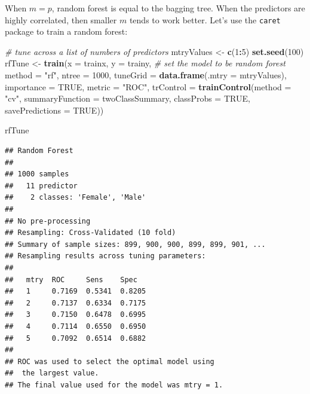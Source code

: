 \documentclass[12pt,]{krantz}
\makeatletter
\newenvironment{Shaded}{\begin{snugshade}}{\end{snugshade}}
\newcommand{\CommentTok}[1]{\textcolor[rgb]{0.37,0.37,0.37}{\textit{#1}}}
\newcommand{\DataTypeTok}[1]{\textcolor[rgb]{0.27,0.27,0.27}{#1}}
\newcommand{\DecValTok}[1]{\textcolor[rgb]{0.06,0.06,0.06}{#1}}
\newcommand{\KeywordTok}[1]{\textcolor[rgb]{0.27,0.27,0.27}{\textbf{#1}}}
\newcommand{\NormalTok}[1]{#1}
\newcommand{\OperatorTok}[1]{\textcolor[rgb]{0.43,0.43,0.43}{\textbf{#1}}}
\newcommand{\OtherTok}[1]{\textcolor[rgb]{0.37,0.37,0.37}{#1}}
\newcommand{\StringTok}[1]{\textcolor[rgb]{0.5,0.5,0.5}{#1}}
\newenvironment{kframe}{%
\medskip{}
\setlength{\fboxsep}{.8em}
 \def\at@end@of@kframe{}%
 \ifinner\ifhmode%
  \def\at@end@of@kframe{\end{minipage}}%
  \begin{minipage}{\columnwidth}%
 \fi\fi%
 \def\FrameCommand##1{\hskip\@totalleftmargin \hskip-\fboxsep
 \colorbox{shadecolor}{##1}\hskip-\fboxsep
     \hskip-\linewidth \hskip-\@totalleftmargin \hskip\columnwidth}%
 \MakeFramed {\advance\hsize-\width
   \@totalleftmargin\z@ \linewidth\hsize
   \@setminipage}}%
 {\par\unskip\endMakeFramed%
 \at@end@of@kframe}
\renewenvironment{Shaded}{\begin{kframe}}{\end{kframe}}
\makeatother
\begin{document}
When \(m=p\), random forest is equal to the bagging tree. When the predictors are highly correlated, then smaller \(m\) tends to work better. Let's use the \texttt{caret} package to train a random forest:

\begin{Shaded}
\begin{Highlighting}[]
\CommentTok{# tune across a list of numbers of predictors}
\NormalTok{mtryValues <-}\StringTok{ }\KeywordTok{c}\NormalTok{(}\DecValTok{1}\OperatorTok{:}\DecValTok{5}\NormalTok{)}
\KeywordTok{set.seed}\NormalTok{(}\DecValTok{100}\NormalTok{)}
\NormalTok{rfTune <-}\StringTok{ }\KeywordTok{train}\NormalTok{(}\DataTypeTok{x =}\NormalTok{ trainx, }
               \DataTypeTok{y =}\NormalTok{ trainy,}
               \CommentTok{# set the model to be random forest}
               \DataTypeTok{method =} \StringTok{"rf"}\NormalTok{,}
               \DataTypeTok{ntree =} \DecValTok{1000}\NormalTok{,}
               \DataTypeTok{tuneGrid =} \KeywordTok{data.frame}\NormalTok{(}\DataTypeTok{.mtry =}\NormalTok{ mtryValues),}
               \DataTypeTok{importance =} \OtherTok{TRUE}\NormalTok{,}
               \DataTypeTok{metric =} \StringTok{"ROC"}\NormalTok{,}
               \DataTypeTok{trControl =} \KeywordTok{trainControl}\NormalTok{(}\DataTypeTok{method =} \StringTok{"cv"}\NormalTok{,}
                           \DataTypeTok{summaryFunction =}\NormalTok{ twoClassSummary,}
                           \DataTypeTok{classProbs =} \OtherTok{TRUE}\NormalTok{,}
                           \DataTypeTok{savePredictions =} \OtherTok{TRUE}\NormalTok{))}
\end{Highlighting}
\end{Shaded}

\begin{Shaded}
\begin{Highlighting}[]
\NormalTok{rfTune}
\end{Highlighting}
\end{Shaded}

\begin{verbatim}
## Random Forest 
## 
## 1000 samples
##   11 predictor
##    2 classes: 'Female', 'Male' 
## 
## No pre-processing
## Resampling: Cross-Validated (10 fold) 
## Summary of sample sizes: 899, 900, 900, 899, 899, 901, ... 
## Resampling results across tuning parameters:
## 
##   mtry  ROC     Sens    Spec  
##   1     0.7169  0.5341  0.8205
##   2     0.7137  0.6334  0.7175
##   3     0.7150  0.6478  0.6995
##   4     0.7114  0.6550  0.6950
##   5     0.7092  0.6514  0.6882
## 
## ROC was used to select the optimal model using
##  the largest value.
## The final value used for the model was mtry = 1.
\end{verbatim}
\end{document}
